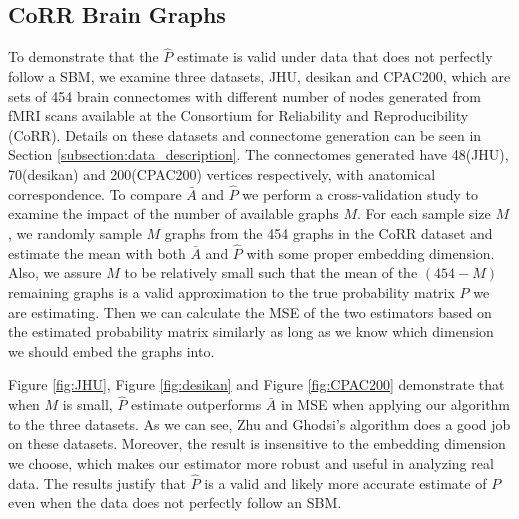 \subsection{CoRR Brain Graphs}
\label{subsection:real_data}

To demonstrate that the $\hat{P}$ estimate is valid under data that does not perfectly follow a SBM, we examine three datasets, JHU, desikan and CPAC200, which are sets of 454 brain connectomes with different number of nodes generated from fMRI scans available at the Consortium for Reliability and Reproducibility (CoRR). Details on these datasets and connectome generation can be seen in Section \ref{subsection:data_description}.  The connectomes generated have 48(JHU), 70(desikan) and 200(CPAC200) vertices respectively, with anatomical correspondence. To compare $\bar{A}$ and $\hat{P}$ we perform a cross-validation study to examine the impact of the number of available graphs $M$.  For each sample size $M$, we randomly sample $M$ graphs from the 454 graphs in the CoRR dataset and estimate the mean with both $\bar{A}$ and $\hat{P}$ with some proper embedding dimension.  Also, we assure $M$ to be relatively small such that the mean of the $(454 - M)$ remaining graphs is a valid approximation to the true probability matrix $P$ we are estimating. Then we can calculate the MSE of the two estimators based on the estimated probability matrix similarly as long as we know which dimension we should embed the graphs into.

Figure \ref{fig:JHU}, Figure \ref{fig:desikan} and Figure \ref{fig:CPAC200} demonstrate that when $M$ is small, $\hat{P}$ estimate outperforms $\bar{A}$ in MSE when applying our algorithm to the three datasets. As we can see, Zhu and Ghodsi's algorithm does a good job on these datasets. Moreover, the result is insensitive to the embedding dimension we choose, which makes our estimator more robust and useful in analyzing real data. The results justify that $\hat{P}$ is a valid and likely more accurate estimate of $P$ even when the data does not perfectly follow an SBM.

